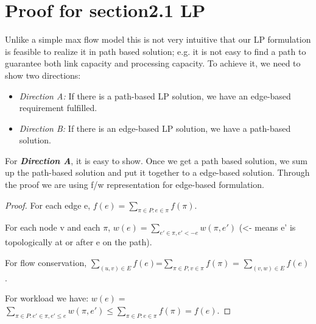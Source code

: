 \documentclass{sig-alternate}
\begin{document}
















 

\appendix
\section{Proof for section2.1 LP}
Unlike a simple max flow model this is not very intuitive that our LP formulation is feasible to realize it in path based solution; e.g. it is not easy to find a path to guarantee both link capacity and processing capacity. To achieve it, we need to show two directions:
\begin{itemize}
  \item {\textit{Direction A:} If there is a path-based LP solution, we have an edge-based requirement fulfilled.}
  \item {\textit{Direction B:} If there is an edge-based LP solution, we have a path-based solution.}
\end{itemize}
For \textbf{\textit{Direction A}}, it is easy to show. Once we get a path based solution, we sum up the path-based solution and put it together to a edge-based solution. Through the proof we are using f/w representation for edge-based formulation.

\begin{proof}

For each edge e, $f(e) =\sum\limits_{\pi\in P: e\in \pi} f(\pi)$.

For each node v and each $\pi$, $w(e) = \sum\limits_{e'\in \pi, e' <- e} w(\pi, e')$ (<- means e' is topologically at or after e on the path).

For flow conservation, $ \sum\limits_{(u,v)\in E} f(e) $=$ \sum\limits_{\pi\in P, v\in \pi} f(\pi)$ = $\sum\limits_{(v,w )\in E} f(e)$.

For workload we have:
$w(e) =$ 
$ \sum\limits_{\pi\in P: e'\in \pi, e' \leq e} w(\pi, e')\leq \sum\limits_{\pi\in P: e\in \pi} f(\pi) = f(e).  $\newline
\end{proof}
\end{document}
